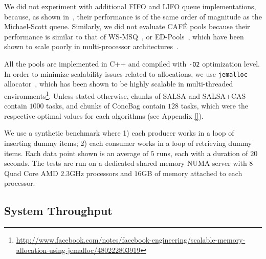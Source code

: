 We did not experiment with additional FIFO and LIFO queue implementations, because, as shown in~\cite{Sundell:2011:LAC:1989493.1989550}, their performance is of the same order of magnitude as the Michael-Scott queue. 
Similarly, we did not evaluate {CAF\'E}\cite{Basin:2011:CST:2075029.2075087} pools because their performance is similar to that of WS-MSQ~\cite{Basin:Thesis:2011}, or ED-Pools~\cite{Afek:2010:SPP:1885276.1885295}, which have been shown to scale poorly in multi-processor architectures~\cite{Basin:Thesis:2011,Sundell:2011:LAC:1989493.1989550}. 

All the pools are implemented in C++ and compiled with \texttt{-O2} optimization level. 
In order to minimize scalability issues related to allocations, we use \texttt{jemalloc} allocator~\cite{citeulike:4951109}, which has been shown to be highly scalable in multi-threaded environments\footnote{\url{http://www.facebook.com/notes/facebook-engineering/scalable-memory-allocation-using-jemalloc/480222803919}}.
Unless stated otherwise, chunks of SALSA and SALSA+CAS contain $1000$ tasks, and chunks of ConcBag contain $128$ tasks, which were the respective optimal values for each algorithms (see Appendix \ref{}). 

We use a synthetic benchmark where 1) each producer works in a loop of inserting dummy items; 2) each consumer works in a loop of retrieving dummy items. Each data point shown is an average of $5$ runs, each with a duration of $20$ seconds. 
The tests are run on a dedicated shared memory NUMA server with $8$ Quad Core AMD $2.3$GHz processors and $16$GB of memory attached to each processor. 

\subsection{System Throughput}
\label{sec:eval-performance}

